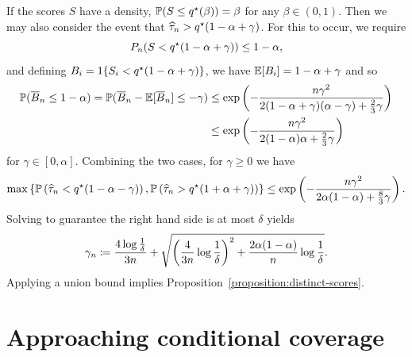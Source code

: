 \documentclass[11pt]{article}
\newcommand{\scorerv}{S}
\begin{document}
If the scores $\scorerv$ have a density,
$\P(\scorerv \le q\opt(\beta)) = \beta$ for any $\beta \in (0, 1)$.
%
Then we may also consider the event that $\widehat{\tau}_n > q^\star(1 - \alpha +
\gamma)$.
%
For this to occur, we require
\begin{equation*}
  P_n(\scorerv < q\opt(1 - \alpha + \gamma)) \le 1 - \alpha,
\end{equation*}
and defining $B_i = \indic{\scorerv_i < q\opt(1 - \alpha + \gamma)}$,
we have $\mathbb{E}[B_i] = 1 - \alpha + \gamma$ and so
\begin{align*}
  \mathbb{P}(\overline{B}_n \le 1 - \alpha)
  = \mathbb{P}(\overline{B}_n - \mathbb{E}[\overline{B}_n] \le -\gamma)
  & \le \exp\left(-\frac{n \gamma^2}{2 (1 - \alpha + \gamma)
    (\alpha - \gamma) + \frac{2}{3} \gamma}\right) \\
  & \le \exp\left(-\frac{n \gamma^2}{2 (1 - \alpha)\alpha + \frac{2}{3}
    \gamma}\right)
\end{align*}
for $\gamma \in [0, \alpha]$.
%
Combining the two cases, for $\gamma \ge 0$ we have
\begin{equation*}
  \max\left\{\mathbb{P}\left(\widehat{\tau}_n < q^\star(1 - \alpha - \gamma)\right),
  \mathbb{P}\left(\widehat{\tau}_n > q^\star(1 + \alpha + \gamma)\right)\right\}
  \le \exp\left(-\frac{n \gamma^2}{2\alpha(1 - \alpha) + \frac{8}{3}
    \gamma}\right).
\end{equation*}
Solving to guarantee the right hand side is at most $\delta$ yields
\begin{equation*}
  \gamma_n \coloneqq \frac{4 \log \frac{1}{\delta}}{3n}
  + \sqrt{\left(\frac{4}{3 n} \log \frac{1}{\delta}\right)^2 +
    \frac{2 \alpha(1 - \alpha)}{n}
    \log \frac{1}{\delta}}.
\end{equation*}
Applying a union bound implies
Proposition~\ref{proposition:distinct-scores}.

\section{Approaching conditional coverage}
\label{sec:approaching-conditional}
\end{document}
